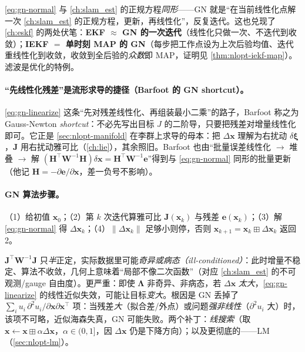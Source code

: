 \begin{insight}
\cref{eq:gn-normal} 与 \cref{ch:slam_est} 的正规方程\emph{同形}——GN 就是“在当前线性化点解一次 \cref{ch:slam_est} 的正规方程，更新，再线性化”，反复迭代。这也兑现了 \cref{ch:eskf} 的两处伏笔：\textbf{EKF $\approx$ GN 的一次迭代}（线性化只做一次、不迭代到收敛）；\textbf{IEKF $=$ 单时刻 MAP 的 GN}（每步把工作点设为上次后验均值、迭代重线性化到收敛，收敛到全后验的\emph{众数}即 MAP，证明见 \cref{thm:nlopt-iekf-map}）。滤波是优化的特例。
\end{insight}

\paragraph{“先线性化残差”是流形求导的捷径（Barfoot 的 GN shortcut）。}
\cref{eq:gn-linearize} 这条“先对残差线性化、再组装最小二乘”的路子，Barfoot\cite{barfoot2024state} 称之为 Gauss-Newton \emph{shortcut}：不必先写出目标 $J$ 的二阶导，只要把残差对增量线性化即可。它正是 \cref{sec:nlopt-manifold} 在李群上求导的母本：把 $\Delta\mathbf{x}$ 理解为右扰动 $\delta\boldsymbol{\xi}$，$\mathbf{J}$ 用右扰动雅可比（\cref{ch:lie}），其余照旧。Barfoot 也由“批量误差线性化 $\to$ 堆叠 $\to$ 解 $(\mathbf{H}^\top\mathbf{W}^{-1}\mathbf{H})\delta\mathbf{x}=\mathbf{H}^\top\mathbf{W}^{-1}\mathbf{e}$”得到与 \cref{eq:gn-normal} 同形的批量更新（他记 $\mathbf{H}=-\partial\mathbf{e}/\partial\mathbf{x}$，差一负号不影响）。

\paragraph{GN 算法步骤。}\cite{gaoxiang2019slam14}
（1）给初值 $\mathbf{x}_0$；（2）第 $k$ 次迭代算雅可比 $\mathbf{J}(\mathbf{x}_k)$ 与残差 $\mathbf{e}(\mathbf{x}_k)$；（3）解 \cref{eq:gn-normal} 得 $\Delta\mathbf{x}_k$；（4）$\|\Delta\mathbf{x}_k\|$ 足够小则停，否则 $\mathbf{x}_{k+1}=\mathbf{x}_k\boxplus\Delta\mathbf{x}_k$ 返回 2。

\begin{pitfall}
$\mathbf{J}^\top\mathbf{W}^{-1}\mathbf{J}$ 只\emph{半}正定，实际数据里可能\emph{奇异或病态（ill-conditioned）}\cite{gaoxiang2019slam14}：此时增量不稳定、算法不收敛，几何上意味着“局部不像二次函数”（对应 \cref{ch:slam_est} 的不可观测/gauge 自由度）。更严重：即使 $\boldsymbol{\Lambda}$ 非奇异、非病态，若 $\Delta\mathbf{x}$ \emph{太大}，\cref{eq:gn-linearize} 的线性近似失效，可能让目标\emph{变大}\cite{gaoxiang2019slam14,barfoot2024state}。根因是 GN 丢掉了 $\sum_i u_i\,\partial^2u_i/\partial\mathbf{x}\partial\mathbf{x}^\top$ 项：当残差\emph{大}（拟合差/外点）或问题\emph{强非线性}（$\partial^2u_i$ 大）时，该项不可略，近似海森失真，GN 可能失败。两个补丁：\emph{线搜索}（取 $\mathbf{x}\leftarrow\mathbf{x}\boxplus\alpha\Delta\mathbf{x}$，$\alpha\in(0,1]$，因 $\Delta\mathbf{x}$ 仍是下降方向）；以及更彻底的——LM（\cref{sec:nlopt-lm}）。
\end{pitfall}

